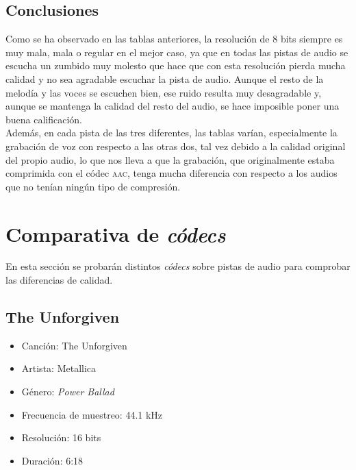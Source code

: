 \documentclass[11pt,a4paper]{article}
\begin{document}
\subsection{Conclusiones}

Como se ha observado en las tablas anteriores, la resolución de 8 bits siempre es muy mala, mala o regular en el mejor caso, ya que en todas las pistas de audio se escucha un zumbido muy molesto que hace que con esta resolución pierda mucha calidad y no sea agradable escuchar la pista de audio. Aunque el resto de la melodía y las voces se escuchen bien, ese ruido resulta muy desagradable y, aunque se mantenga la calidad del resto del audio, se hace imposible poner una buena calificación.\\

Además, en cada pista de las tres diferentes, las tablas varían, especialmente la grabación de voz con respecto a las otras dos, tal vez debido a la calidad original del propio audio, lo que nos lleva a que la grabación, que originalmente estaba comprimida con el códec \textsc{aac}, tenga mucha diferencia con respecto a los audios que no tenían ningún tipo de compresión.

\newpage

\section{Comparativa de \textit{códecs}}

En esta sección se probarán distintos \textit{códecs} sobre pistas de audio para comprobar las diferencias de calidad.

\subsection{The Unforgiven}

\begin{itemize}
	\item Canción: The Unforgiven
	\item Artista: Metallica
	\item Género: \textit{Power Ballad}
	\item Frecuencia de muestreo: 44.1 kHz
	\item Resolución: 16 bits
	\item Duración: 6:18
\end{itemize}
\end{document}
